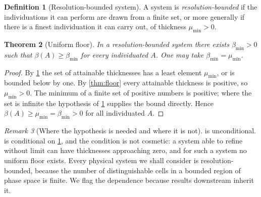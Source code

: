 \documentclass[11pt,twocolumn,a4paper]{article}
\theoremstyle{plain}
\newtheorem{theorem}{Theorem}[section]
\theoremstyle{definition}
\newtheorem{definition}[theorem]{Definition}
\theoremstyle{remark}
\newtheorem{remark}[theorem]{Remark}
\newcommand{\thick}{\beta}
\newcommand{\floor}{\thick_{\min}}
\begin{document}
\begin{definition}[Resolution-bounded system]
\label{def:res-bounded}
A system is \emph{resolution-bounded} if the individuations it can perform are
drawn from a finite set, or more generally if there is a finest individuation it
can carry out, of thickness $\mu_{\min} > 0$.
\end{definition}

\begin{theorem}[Uniform floor]
\label{thm:uniform-floor}
In a resolution-bounded system there exists $\floor > 0$ such that
$\thick(A) \geq \floor$ for every individuated $A$. One may take
$\floor = \mu_{\min}$.
\end{theorem}

\begin{proof}
By \cref{def:res-bounded} the set of attainable thicknesses has a least element
$\mu_{\min}$, or is bounded below by one. By \cref{thm:floor} every attainable
thickness is positive, so $\mu_{\min}>0$. The minimum of a finite set of
positive numbers is positive; where the set is infinite the hypothesis of
\cref{def:res-bounded} supplies the bound directly. Hence
$\thick(A) \geq \mu_{\min} = \floor > 0$ for all individuated $A$.
\end{proof}

\begin{remark}[Where the hypothesis is needed and where it is not]
\label{rem:hypothesis}
 is unconditional.  is conditional on
\cref{def:res-bounded}, and the condition is not cosmetic: a system able to
refine without limit can have thicknesses approaching zero, and for such a
system no uniform floor exists. Every physical system we shall consider is
resolution-bounded, because the number of distinguishable cells in a bounded
region of phase space is finite. We flag the dependence because results
downstream inherit it.
\end{remark}
\end{document}
